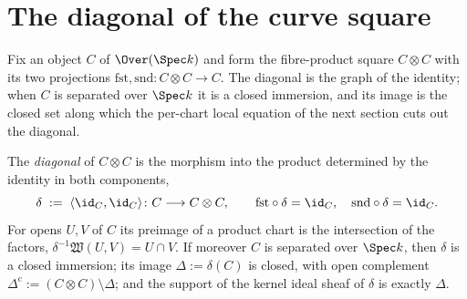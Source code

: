 \section{The diagonal of the curve square}

Fix an object \(C\) of \(\Over(\Spec k)\) and form the fibre-product square \(C \otimes C\) with
its two projections \(\mathrm{fst}, \mathrm{snd} \colon C \otimes C \to C\). The diagonal is the
graph of the identity; when \(C\) is separated over \(\Spec k\) it is a closed immersion, and its
image is the closed set along which the per-chart local equation of the next section cuts out the
diagonal.

\begin{definition}
  \label{def:diagonal}
  \leanok
  The \emph{diagonal} of \(C \otimes C\) is the morphism into the product determined by the
  identity in both components,
  \[
    \delta \;:=\; \langle \id_C, \id_C \rangle \colon C \longrightarrow C \otimes C, \qquad
    \mathrm{fst} \circ \delta = \id_C, \quad \mathrm{snd} \circ \delta = \id_C .
  \]
  For opens \(U, V\) of \(C\) its preimage of a product chart is the intersection of the factors,
  \(\delta^{-1}\mathfrak W(U,V) = U \cap V\). If moreover \(C\) is separated over \(\Spec k\),
  then \(\delta\) is a closed immersion; its image \(\Delta := \delta(C)\) is closed, with open
  complement \(\Delta^{\mathrm{c}} := (C \otimes C) \setminus \Delta\); and the support of the
  kernel ideal sheaf of \(\delta\) is exactly \(\Delta\).
\end{definition}
